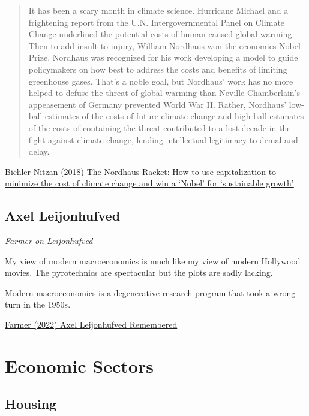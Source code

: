 \documentclass[
]{book}
\begin{document}
\begin{quote}
It has been a scary month in climate science. Hurricane Michael and a frightening report from the U.N. Intergovernmental Panel on Climate Change underlined the potential costs of human-caused global warming. Then to add insult to injury, William Nordhaus won the economics Nobel Prize.
Nordhaus was recognized for his work developing a model to guide policymakers on how best to address the costs and benefits of limiting greenhouse gases. That's a noble goal, but Nordhaus' work has no more helped to defuse the threat of global warming than Neville Chamberlain's appeasement of Germany prevented World War II. Rather, Nordhaus' low-ball estimates of the costs of future climate change and high-ball estimates of the costs of containing the threat contributed to a lost decade in the fight against climate change, lending intellectual legitimacy to denial and delay.
\end{quote}

\href{https://rwer.wordpress.com/2018/11/05/the-nordhaus-racket-how-to-use-capitalization-to-minimize-the-cost-of-climate-change-and-win-a-nobel-for-sustainable-growth/}{Bichler Nitzan (2018) The Nordhaus Racket: How to use capitalization to minimize the cost of climate change and win a `Nobel' for `sustainable growth'}

\hypertarget{axel-leijonhufved}{%
\section{Axel Leijonhufved}\label{axel-leijonhufved}}

\emph{Farmer on Leijonhufved}

My view of modern macroeconomics is much like my view of modern Hollywood movies. The pyrotechnics are spectacular but the plots are sadly lacking.

Modern macroeconomics is a degenerative research program that took a wrong turn in the 1950s.

\href{https://www.rogerfarmer.com/rogerfarmerblog/2022/5/7/axel-leijonhufvud-september-6th-1933-may-2nd-2022}{Farmer (2022) Axel Leijonhufved Remembered}

\hypertarget{economic-sectors}{%
\chapter{Economic Sectors}\label{economic-sectors}}

\hypertarget{housing}{%
\section{Housing}\label{housing}}
\end{document}
